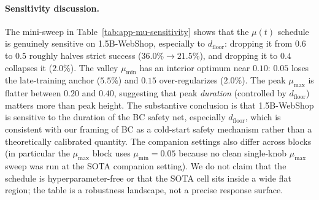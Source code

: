 
\paragraph{Sensitivity discussion.}
The mini-sweep in Table~\ref{tab:app-mu-sensitivity} shows that the $\mu(t)$
schedule is genuinely sensitive on 1.5B-WebShop, especially to
$d_{\text{floor}}$: dropping it from $0.6$ to $0.5$ roughly halves strict
success ($36.0\%\!\rightarrow\!21.5\%$), and dropping it to $0.4$ collapses
it ($2.0\%$). The valley $\mu_{\min}$ has an interior optimum near $0.10$:
$0.05$ loses the late-training anchor ($5.5\%$) and $0.15$ over-regularizes
($2.0\%$). The peak $\mu_{\max}$ is flatter between $0.20$ and $0.40$,
suggesting that peak \emph{duration} (controlled by $d_{\text{floor}}$)
matters more than peak height. The substantive conclusion is that
1.5B-WebShop is sensitive to the duration of the BC safety net, especially
$d_{\text{floor}}$, which is consistent with our framing of BC as a
cold-start safety mechanism rather than a theoretically calibrated quantity.
The companion settings also differ across blocks (in particular the
$\mu_{\max}$ block uses $\mu_{\min}=0.05$ because no clean single-knob
$\mu_{\max}$ sweep was run at the SOTA companion setting). We do not claim
that the schedule is hyperparameter-free or that the SOTA cell sits inside a
wide flat region; the table is a robustness landscape, not a precise
response surface.
